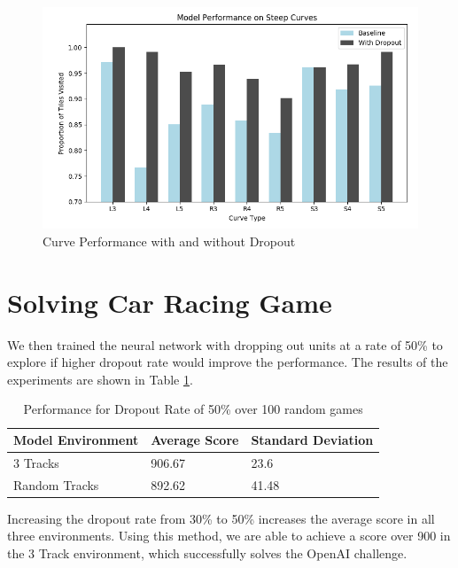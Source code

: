 \begin{figure}[h!]
\centering\includegraphics[scale=0.6,clip]
{Graphics/dropout_curve.png}
\caption[Curve Performance with Dropout]{Curve Performance with and without Dropout}
\label{fig:dropout_curve}
\end{figure}

\section{Solving Car Racing Game}\label{solve}
We then trained the neural network with dropping out units at a rate of 50\% to explore if higher dropout rate would improve the performance. The results of the experiments are shown in Table \ref{table:dropout_1}. 

\newpage
\begin{table}[h]
\centering
\begin{tabular}{ m{4cm} | m{3cm}| m{3.5cm} } 
Model Environment & Average Score & Standard Deviation \\ 
\hline 
3 Tracks & 906.67 & 23.6 \\
Random Tracks & 892.62 & 41.48 \\
\end{tabular}
\caption{Performance for Dropout Rate of 50\% over 100 random games}
\label{table:dropout_1}
\end{table}

Increasing the dropout rate from 30\% to 50\% increases the average score in all three environments. Using this method, we are able to achieve a score over 900 in the 3 Track environment, which successfully solves the OpenAI challenge.


\endinput

